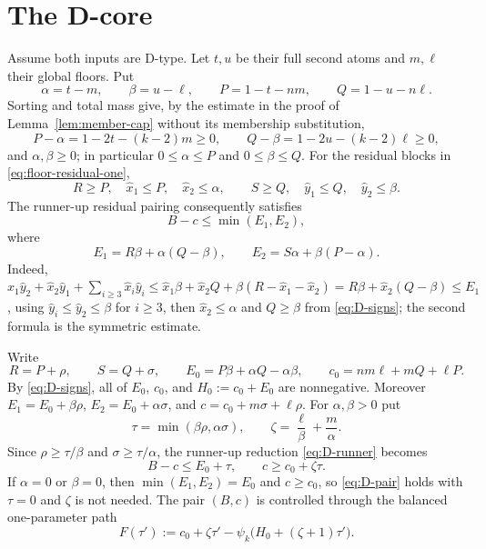 \documentclass[11pt]{article}
\theoremstyle{definition}
\theoremstyle{remark}
\begin{document}
\section{The D-core}\label{sec:D-core}

Assume both inputs are D-type.  Let $t,u$ be their full second atoms and
$m,\ell$ their global floors.  Put
\begin{equation}\label{eq:D-parameters}
 \alpha=t-m,\qquad\beta=u-\ell,\qquad
 P=1-t-nm,\qquad Q=1-u-n\ell.
\end{equation}
Sorting and total mass give, by the estimate in the proof of
Lemma~\ref{lem:member-cap} without its membership substitution,
\begin{equation}\label{eq:D-signs}
 P-\alpha=1-2t-(k-2)m\ge0,\qquad
 Q-\beta=1-2u-(k-2)\ell\ge0,
\end{equation}
and $\alpha,\beta\ge0$; in particular $0\le\alpha\le P$ and
$0\le\beta\le Q$.
For the residual blocks in \eqref{eq:floor-residual-one},
\[
 R\ge P,\quad \hat x_1\le P,\quad \hat x_2\le\alpha,\qquad
 S\ge Q,\quad \hat y_1\le Q,\quad \hat y_2\le\beta.
\]
The runner-up residual pairing consequently satisfies
\begin{equation}\label{eq:D-runner}
 B-c\le\min(E_1,E_2),
\end{equation}
where
\begin{equation}\label{eq:D-E12}
 E_1=R\beta+\alpha(Q-\beta),\qquad
 E_2=S\alpha+\beta(P-\alpha).
\end{equation}
Indeed,
$\hat x_1\hat y_2+\hat x_2\hat y_1+\sum_{i\ge3}\hat x_i\hat y_i
\le\hat x_1\beta+\hat x_2Q+\beta(R-\hat x_1-\hat x_2)
=R\beta+\hat x_2(Q-\beta)\le E_1$,
using $\hat y_i\le\hat y_2\le\beta$ for $i\ge3$, then $\hat x_2\le\alpha$
and $Q\ge\beta$ from \eqref{eq:D-signs}; the second formula is the
symmetric estimate.

Write
\begin{equation}\label{eq:D-excess}
 R=P+\rho,\qquad S=Q+\sigma,\qquad
 E_0=P\beta+\alpha Q-\alpha\beta,\qquad
 c_0=nm\ell+mQ+\ell P.
\end{equation}
By \eqref{eq:D-signs}, all of $E_0$, $c_0$, and $H_0:=c_0+E_0$ are
nonnegative.  Moreover $E_1=E_0+\beta\rho$, $E_2=E_0+\alpha\sigma$, and
$c=c_0+m\sigma+\ell\rho$.  For $\alpha,\beta>0$ put
\begin{equation}\label{eq:D-tau}
 \tau=\min(\beta\rho,\alpha\sigma),\qquad
 \zeta=\frac{\ell}{\beta}+\frac{m}{\alpha}.
\end{equation}
Since $\rho\ge\tau/\beta$ and $\sigma\ge\tau/\alpha$, the runner-up
reduction \eqref{eq:D-runner} becomes
\begin{equation}\label{eq:D-pair}
 B-c\le E_0+\tau,\qquad c\ge c_0+\zeta\tau.
\end{equation}
If $\alpha=0$ or $\beta=0$, then $\min(E_1,E_2)=E_0$ and $c\ge c_0$, so
\eqref{eq:D-pair} holds with $\tau=0$ and $\zeta$ is not needed.  The
pair $(B,c)$ is controlled through the balanced one-parameter path
\begin{equation}\label{eq:D-F}
 F(\tau'):=c_0+\zeta\tau'-
 \psi_k\bigl(H_0+(\zeta+1)\tau'\bigr).
\end{equation}
\end{document}
